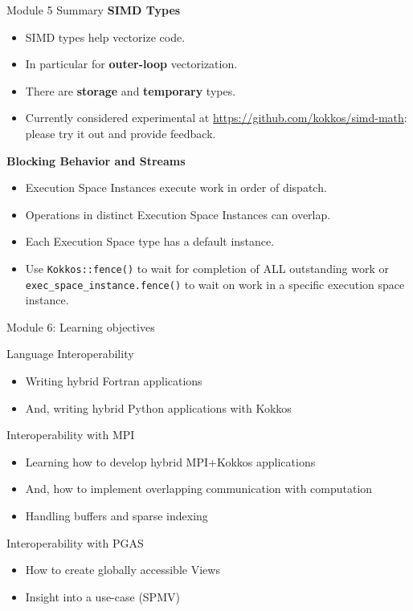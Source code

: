 \begin{frame}[fragile]{Module 5 Summary}
\textbf{SIMD Types}
	\begin{itemize}
		\item{SIMD types help vectorize code.}
		\item{In particular for \textbf{outer-loop} vectorization.}
		\item{There are \textbf{storage} and \textbf{temporary} types.}
		\item{Currently considered experimental at \url{https://github.com/kokkos/simd-math}: please try it out and provide feedback.}
	\end{itemize}

\textbf{Blocking Behavior and Streams}
  \begin{itemize}
    \item{Execution Space Instances execute work in order of dispatch.}
    \item{Operations in distinct Execution Space Instances can overlap.}
    \item{Each Execution Space type has a default instance.}
    \item{Use \texttt{Kokkos::fence()} to wait for completion of ALL outstanding work or \texttt{exec\_space\_instance.fence()} to wait on work in a specific execution space instance.}
  \end{itemize}

\end{frame}


\begin{frame}{Module 6: Learning objectives}
  \begin{block}{Language Interoperability}
    \begin{itemize}
    \item Writing hybrid Fortran applications
    \item And, writing hybrid Python applications with Kokkos
  \end{itemize}
  \end{block}

  \begin{block}{Interoperability with MPI}
  \begin{itemize}
    \item Learning how to develop hybrid MPI+Kokkos applications
    \item And, how to implement overlapping communication with computation
    \item Handling buffers and sparse indexing
  \end{itemize}
  \end{block}

  \begin{block}{Interoperability with PGAS}
  \begin{itemize}
    \item How to create globally accessible Views
    \item Insight into a use-case (SPMV)
  \end{itemize}
  \end{block}
\end{frame}

